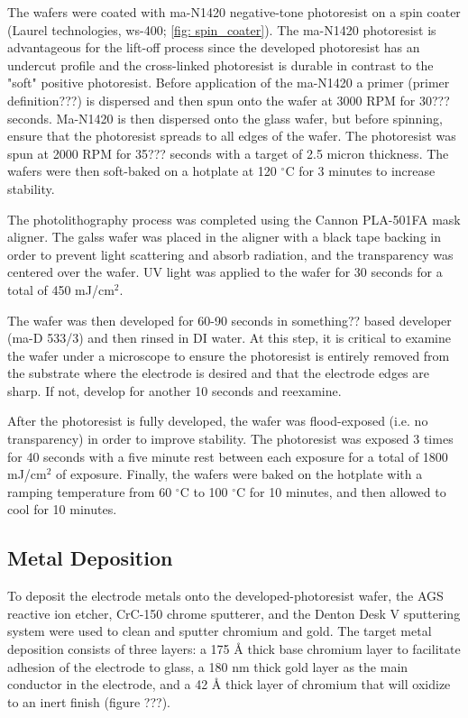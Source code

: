 \par The wafers were coated with ma-N1420 negative-tone photoresist on a spin coater (Laurel technologies, ws-400; \ref{fig: spin_coater}). The ma-N1420 photoresist is advantageous for the lift-off process since the developed photoresist has an undercut profile and the cross-linked photoresist is durable in contrast to the "soft" positive photoresist. Before application of the ma-N1420 a primer (primer definition???) is dispersed and then spun onto the wafer at 3000 RPM for 30??? seconds. Ma-N1420 is then dispersed onto the glass wafer, but before spinning, ensure that the photoresist spreads to all edges of the wafer. The photoresist was spun at 2000 RPM for 35??? seconds with a target of 2.5 micron thickness. The wafers were then soft-baked on a hotplate at 120 $^\circ$C for 3 minutes to increase stability. 

\par The photolithography process was completed using the Cannon PLA-501FA mask aligner. The galss wafer was placed in the aligner with a black tape backing in order to prevent light scattering and absorb radiation, and the transparency was centered over the wafer. UV light was applied to the wafer for 30 seconds for a total of 450 mJ/cm$^2$. 

\par The wafer was then developed for 60-90 seconds in something?? based developer (ma-D 533/3) and then rinsed in DI water. At this step, it is critical to examine the wafer under a microscope to ensure the photoresist is entirely removed from the substrate where the electrode is desired and that the electrode edges are sharp. If not, develop for another 10 seconds and reexamine. 

\par After the photoresist is fully developed, the wafer was flood-exposed (i.e. no transparency) in order to improve stability. The photoresist was exposed 3 times for 40 seconds with a five minute rest between each exposure for a total of 1800 mJ/cm$^2$ of exposure. Finally, the wafers were baked on the hotplate with a ramping temperature from 60 $^\circ$C to 100 $^\circ$C for 10 minutes, and then allowed to cool for 10 minutes. 

\subsection*{Metal Deposition}

\par To deposit the electrode metals onto the developed-photoresist wafer, the AGS reactive ion etcher, CrC-150 chrome sputterer, and the Denton Desk V sputtering system were used to clean and sputter chromium and gold. The target metal deposition consists of three layers: a 175 \si{\angstrom} thick base chromium layer to facilitate adhesion of the electrode to glass, a 180 nm thick gold layer as the main conductor in the electrode, and a 42 \si{\angstrom} thick layer of chromium that will oxidize to an inert finish (figure ???).

